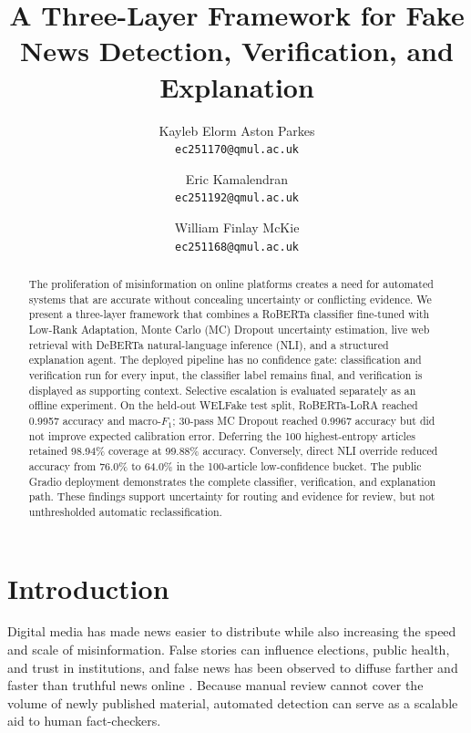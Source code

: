 \documentclass[10pt,twocolumn,letterpaper]{article}
\begin{document}
\title{A Three-Layer Framework for Fake News Detection, Verification, and Explanation}

\author{Kayleb Elorm Aston Parkes\\
{\tt\small ec251170@qmul.ac.uk}
\and
Eric Kamalendran\\
{\tt\small ec251192@qmul.ac.uk}
\and
William Finlay McKie\\
{\tt\small ec251168@qmul.ac.uk}
}

\maketitle

\begin{abstract}
The proliferation of misinformation on online platforms creates a need for
automated systems that are accurate without concealing uncertainty or conflicting
evidence. We present a three-layer framework that combines a RoBERTa classifier
fine-tuned with Low-Rank Adaptation, Monte Carlo (MC) Dropout uncertainty
estimation, live web retrieval with DeBERTa natural-language inference (NLI), and
a structured explanation agent. The deployed pipeline has no confidence gate:
classification and verification run for every input, the classifier label remains
final, and verification is displayed as supporting context. Selective escalation
is evaluated separately as an offline experiment. On the held-out WELFake test
split, RoBERTa-LoRA reached 0.9957 accuracy and macro-$F_1$; 30-pass MC Dropout
reached 0.9967 accuracy but did not improve expected calibration error. Deferring
the 100 highest-entropy articles retained 98.94\% coverage at 99.88\% accuracy.
Conversely, direct NLI override reduced accuracy from 76.0\% to 64.0\% in the
100-article low-confidence bucket. The public Gradio deployment demonstrates the
complete classifier, verification, and explanation path. These findings support
uncertainty for routing and evidence for review, but not unthresholded automatic
reclassification.
\end{abstract}

\section{Introduction}
Digital media has made news easier to distribute while also increasing the speed
and scale of misinformation. False stories can influence elections, public health,
and trust in institutions, and false news has been observed to diffuse farther and
faster than truthful news online \cite{vosoughi2018spread}. Because manual review
cannot cover the volume of newly published material, automated detection can serve
as a scalable aid to human fact-checkers.
\end{document}
